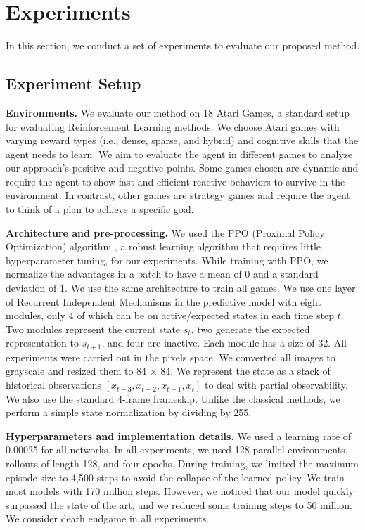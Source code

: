 \section{Experiments}
\label{sec:experiment}

In this section, we conduct a set of experiments to evaluate our proposed method.

\subsection{Experiment Setup}
\label{experiment_setup}

\textbf{Environments.} We evaluate our method on 18 Atari Games, a standard setup for evaluating Reinforcement Learning methods. We choose Atari games with varying reward types (i.e., dense, sparse, and hybrid) and cognitive skills that the agent needs to learn. We aim to evaluate the agent in different games to analyze our approach's positive and negative points. Some games chosen are dynamic and require the agent to show fast and efficient reactive behaviors to survive in the environment. In contrast, other games are strategy games and require the agent to think of a plan to achieve a specific goal. 


\textbf{Architecture and pre-processing.} We used the PPO (Proximal Policy Optimization) algorithm \cite{schulman2017proximal}, a robust learning algorithm that requires little hyperparameter tuning, for our experiments. While training with PPO, we normalize the advantages \cite{sutton2018reinforcement} in a batch to have a mean of 0 and a standard deviation of 1. We use the same architecture to train all games. We use one layer of Recurrent Independent Mechanisms in the predictive model with eight modules, only 4 of which can be on active/expected states in each time step $t$. Two modules represent the current state $s_{t}$, two generate the expected representation to $s_{t+1}$, and four are inactive. Each module has a size of 32. All experiments were carried out in the pixels space. We converted all images to grayscale and resized them to 84 $\times$ 84. We represent the state as a stack of historical observations $\left [ x_{t-3}, x_{t-2}, x_{t-1}, x_{t}\right ]$ to deal with partial observability. We also use the standard 4-frame frameskip. Unlike the classical methods, we perform a simple state normalization by dividing by 255.


\textbf{Hyperparameters and implementation details.} We used a learning rate of 0.00025 for all networks. In all experiments, we used 128 parallel environments, rollouts of length 128, and four epochs. During training, we limited the maximum episode size to 4,500 steps to avoid the collapse of the learned policy. We train most models with 170 million steps. However, we noticed that our model quickly surpassed the state of the art, and we reduced some training steps to 50 million. We consider death endgame in all experiments.



